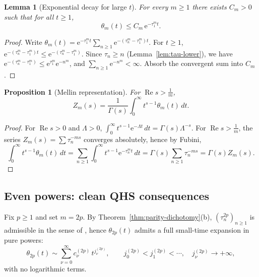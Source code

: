 \documentclass[11pt,letterpaper]{amsart}
\numberwithin{equation}{section}
\newtheorem{lemma}[theorem]{Lemma}
\newtheorem{proposition}[theorem]{Proposition}
\theoremstyle{definition}
\newcommand{\Ree}{\operatorname{Re}}
\newcommand{\e}{\mathrm{e}}
\begin{document}
\begin{lemma}[Exponential decay for large $t$]\label{lem:theta-m-exp-decay}
For every $m\ge1$ there exists $C_m>0$ such that for all $t\ge1$,
\[
\theta_m(t)\le C_m\,\e^{-\tau_1^m t}.
\]
\end{lemma}

\begin{proof}
Write $\theta_m(t)=\e^{-\tau_1^m t}\sum_{n\ge1}\e^{-(\tau_n^m-\tau_1^m)t}$.
For $t\ge1$, $\e^{-(\tau_n^m-\tau_1^m)t}\le \e^{-(\tau_n^m-\tau_1^m)}$.
Since $\tau_n\ge n$ (Lemma~\ref{lem:tau-lower}), we have
$\e^{-(\tau_n^m-\tau_1^m)}\le \e^{\tau_1^m}\e^{-n^m}$, and $\sum_{n\ge1}\e^{-n^m}<\infty$.
Absorb the convergent sum into $C_m$.
\end{proof}

\begin{proposition}[Mellin representation]\label{prop:mellin-Zm}
For $\Ree s>\tfrac1m$,
\begin{equation}\label{eq:mellin-Zm}
Z_m(s)=\frac{1}{\Gamma(s)}\int_0^\infty t^{s-1}\theta_m(t)\,dt.
\end{equation}
\end{proposition}

\begin{proof}
For $\Ree s>0$ and $\Lambda>0$,
$\int_0^\infty t^{s-1}\e^{-\Lambda t}\,dt=\Gamma(s)\Lambda^{-s}$.
For $\Ree s>\tfrac1m$, the series $Z_m(s)=\sum\tau_n^{-ms}$ converges absolutely, hence by Fubini,
\[
\int_0^\infty t^{s-1}\theta_m(t)\,dt
=\sum_{n\ge1}\int_0^\infty t^{s-1}\e^{-\tau_n^m t}\,dt
=\Gamma(s)\sum_{n\ge1}\tau_n^{-ms}=\Gamma(s)Z_m(s).
\]
\end{proof}

\subsection{Even powers: clean QHS consequences}

Fix $p\ge1$ and set $m=2p$. By Theorem~\ref{thm:parity-dichotomy}\textup{(b)},
$(\tau_n^{2p})_{n\ge1}$ is admissible in the sense of \cite{QHS}, hence $\theta_{2p}(t)$ admits a full
small-time expansion in pure powers:
\begin{equation}\label{eq:theta2p-exp}
\theta_{2p}(t)\sim\sum_{\nu=0}^\infty c^{(2p)}_\nu\,t^{j^{(2p)}_\nu},
\qquad j^{(2p)}_0<j^{(2p)}_1<\cdots,\quad j^{(2p)}_\nu\to+\infty,
\end{equation}
with no logarithmic terms.
\end{document}
